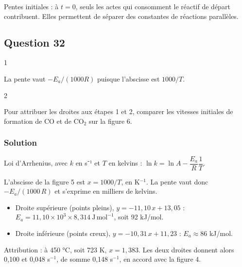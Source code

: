\documentclass[11pt,a4paper]{article}
\providecommand{\tightlist}{\setlength{\itemsep}{0pt}\setlength{\parskip}{0pt}}
\begin{document}
\begin{methode}

Pentes initiales : à \(t=0\), seuls les actes qui consomment le réactif de départ contribuent. Elles permettent de séparer des constantes de réactions parallèles.

\end{methode}

\hypertarget{question-32}{%
\subsection{Question 32}\label{question-32}}

\begin{indication}{1}

La pente vaut \(-E_a/(1000R)\) puisque l'abscisse est \(1000/T\).

\end{indication}

\begin{indication}{2}

Pour attribuer les droites aux étapes 1 et 2, comparer les vitesses initiales de formation de CO et de CO\(_2\) sur la figure 6.

\end{indication}

\hypertarget{solution-31}{%
\subsubsection{Solution}\label{solution-31}}

Loi d'Arrhenius, avec \(k\) en s⁻¹ et \(T\) en kelvins : \(\ln k=\ln A-\dfrac{E_a}{R}\dfrac1T\).

L'abscisse de la figure 5 est \(x=1000/T\), en K\(^{-1}\). La pente vaut donc \(-E_a/(1000\,R)\) et s'exprime en milliers de kelvins.

\begin{itemize}
\tightlist
\item
  Droite supérieure (points pleins), \(y=-11{,}10\,x+13{,}05\) : \(E_a=11{,}10\times10^3\times8{,}314\ \mathrm{J\,mol^{-1}}\), soit 92 kJ/mol.
\item
  Droite inférieure (points creux), \(y=-10{,}31\,x+11{,}23\) : \(E_a\approx86\) kJ/mol.
\end{itemize}

Attribution : à 450 °C, soit 723 K, \(x=1{,}383\). Les deux droites donnent alors 0,100 et 0,048 s\(^{-1}\), de somme 0,148 s\(^{-1}\), en accord avec la figure 4.
\end{document}
